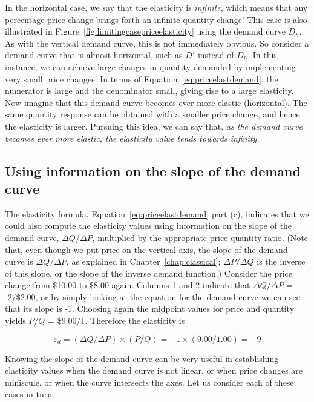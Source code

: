 

In the horizontal case, we say that the elasticity is \textit{infinite}, which means that any percentage price change brings forth an infinite quantity change! This case is also illustrated in Figure~\ref{fig:limitingcasepriceelasticity} using the demand curve $D_h$. As with the vertical demand curve, this is not immediately obvious. So consider a demand curve that is almost horizontal, such as $D'$ instead of $D_h$. In this instance, we can achieve large changes in quantity demanded by implementing very small price changes. In terms of Equation~\ref{eq:priceelastdemand}, the numerator is large and the denominator small, giving rise to a large elasticity. Now imagine that this demand curve becomes ever more elastic (horizontal). The same quantity response can be obtained with a smaller price change, and hence the elasticity is larger. Pursuing this idea, we can say that, \textit{as the demand curve becomes ever more elastic, the elasticity value tends towards infinity.}

\subsection*{Using information on the slope of the demand curve}

The elasticity formula, Equation~\ref{eq:priceelastdemand} part (c), indicates that we could also compute the elasticity values using information on the slope of the demand curve, $\Delta Q/\Delta P$, multiplied by the appropriate price-quantity ratio. (Note that, even though we put price on the vertical axis, the slope of the demand curve is $\Delta Q/\Delta P$, as explained in Chapter~\ref{chap:classical}; $\Delta P/\Delta Q$ is the inverse of this slope, or the slope of the inverse demand function.) Consider the price change from \$10.00 to \$8.00 again. Columns 1 and 2 indicate that $\Delta Q/\Delta P$ = -2/\$2.00, or by simply looking at the equation for the demand curve we can see that its slope is -1.  Choosing again the midpoint values for price and quantity yields $P/Q$ = \$9.00/1. Therefore the elasticity is 

\begin{equation*}
\varepsilon_d=(\Delta Q/\Delta P)\times(P/Q)=-1\times (9.00/1.00)=-9
\end{equation*}

Knowing the slope of the demand curve can be very useful in establishing elasticity values when the demand curve is not linear, or when price changes are miniscule, or when the curve intersects the axes. Let us consider each of these cases in turn.

